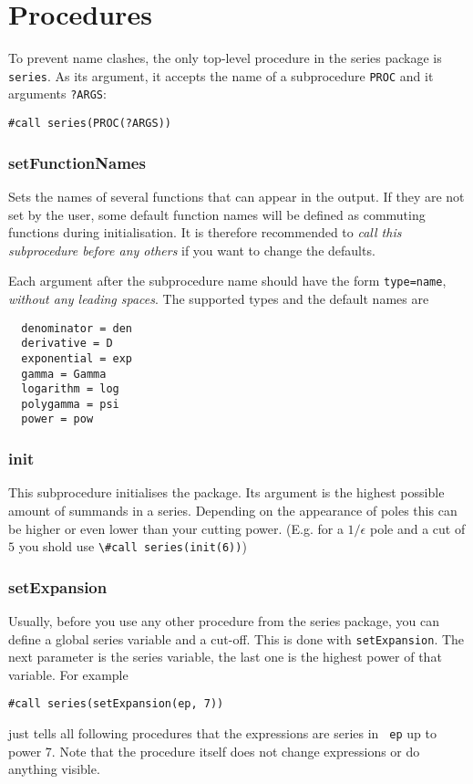 \documentclass[titlepage]{article}
\begin{document}
\section{Procedures}
\label{sec:proc}

To prevent name clashes, the only top-level procedure in the series
package is \lstinline!series!. As its argument, it accepts the name of
a subprocedure \lstinline!PROC! and it arguments \lstinline!?ARGS!:
\begin{lstlisting}
#call series(PROC(?ARGS))
\end{lstlisting}

\subsubsection{setFunctionNames}
\label{sec:setFunctionNames}

Sets the names of several functions that can appear in the output. If
they are not set by the user, some default function names will be
defined as commuting functions during initialisation. It is therefore
recommended to \emph{call this subprocedure before any others} if you
want to change the defaults.

Each argument after the subprocedure name should have the form
\lstinline!type=name!, \emph{without any leading spaces}. The
supported types and the default names are
\begin{lstlisting}
  denominator = den
  derivative = D
  exponential = exp
  gamma = Gamma
  logarithm = log
  polygamma = psi
  power = pow
\end{lstlisting}

\subsubsection{init}
\label{sec:init}

This subprocedure initialises the package. Its argument is the highest possible amount of
summands in a series. Depending on the appearance of poles this can be
higher or even lower than your cutting power. (E.g. for a $1/\epsilon$
pole and a cut of $5$ you shold use \lstinline!\#call series(init(6))!)

\subsubsection{setExpansion}
\label{sec:setExpansion}

Usually, before you use any other procedure from the series package, you can
define a global series variable and a cut-off. This is done with \lstinline!setExpansion!. The next parameter is the series variable, the
last one is the highest power of that variable. For example
\begin{lstlisting}
#call series(setExpansion(ep, 7))
\end{lstlisting}
just tells all following procedures that the expressions are series in {\tt
  ep} up to power 7. Note that the procedure itself does
not change expressions or do anything visible.
\end{document}
